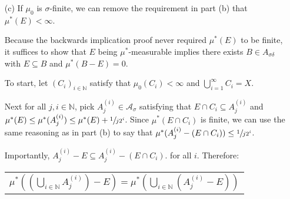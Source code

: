 \documentclass{book}
\newcommand{\exTwoP}{%
   \color{RedViolet}%
   \fontsize{13}{15}\selectfont%
}
\newenvironment{myIndent}{%
   \begin{adjustwidth}{2.5em}{0em}%
}{%
   \end{adjustwidth}%
}
\newcommand{\comp}{\mathsf{C}}
\newcommand{\retTwo}{\hfill\bigbreak}
\begin{document}
\begin{enumerate}
\begin{myIndent}
      To prove the reverse implication, suppose there exists a $\mu^*$-separable set $B$\\ satisfying that $E \subseteq B$ and $\mu^*(B - E) = 0$ (any set in $\mathcal{A}_{\sigma\delta}$ will be $\mu^*$-separable because $\mathcal{A}_{\sigma\delta} \subseteq \mathcal{M}(\mathcal{A})$). Then given any set $F$, we have that:

      {\centering 
      \begin{tabular}{l}
         $\mu^*(F - E) = \mu^*(F \cap E^\comp \cap B) + \mu^*(F \cap E^\comp \cap B^\comp)$\\ [2pt]
         $\phantom{\mu^*(F - E)} = \mu^*(F \cap (B - E)) + \mu^*(F - B) = \mu^*(F - B)$
      \end{tabular} \retTwo\par}

      Also, since $F \cap E \subseteq F \cap B$, we know that $\mu^*(F \cap E) \leq \mu^*(F \cap B)$.\retTwo

      So, $\mu^*(F \cap E) + \mu^*(F - E) \leq \mu^*(F \cap B) + \mu^*(F - B)  = \mu^*(F)$. Hence, $E$ is $\mu^*$-measurable.\retTwo      
   \end{myIndent}

   \item[(c)] If $\mu_0$ is $\sigma$-finite, we can remove the requirement in part (b) that $\mu^*(E) < \infty$.
   
   \begin{myIndent}\exTwoP
      Because the backwards implication proof never required $\mu^*(E)$ to be finite, it suffices to show that $E$ being $\mu^*$-measurable implies there exists $B \in A_{\sigma\delta}$ with $E \subseteq B$ and $\mu^*(B - E) = 0$.\retTwo

      To start, let $(C_i)_{i \in \mathbb{N}}$ satisfy that $\mu_0(C_i) < \infty$ and $\bigcup\limits_{i = 1}^\infty C_i = X$.\newpage
      
      Next for all $j, i \in \mathbb{N}$, pick $A_j^{(i)} \in \mathcal{A}_\sigma$ satisfying that $E \cap C_i \subseteq A_j^{(i)}$ and\\ $\mu^*(E) \leq \mu^*(A_j^{(i)}) \leq \mu^*(E) + \sfrac{1}{j2^{i}}$. Since $\mu^*(E \cap C_i)$ is finite, we can use the same reasoning as in part (b) to say that $\mu^*(A_j^{(i)} - (E \cap C_i)) \leq \sfrac{1}{j2^i}$.\retTwo

      Importantly, $A_j^{(i)} - E \subseteq A_j^{(i)} - (E \cap C_i)$. for all $i$. Therefore:
      
      {\centering
      \begin{tabular}{l}
         $\mu^*((\bigcup\limits_{i\in\mathbb{N}}A_j^{(i)}) - E) = \mu^*(\bigcup\limits_{i\in\mathbb{N}}(A_j^{(i)} - E))$\\ [6pt]
         

\end{tabular}}
\end{myIndent}
\end{enumerate}
\end{document}
